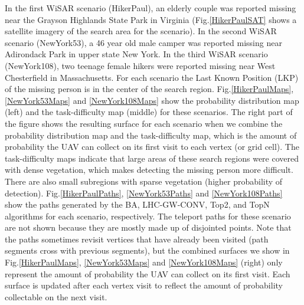 In the first WiSAR scenario (HikerPaul), an elderly couple was reported missing near the Grayson Highlands State Park in Virginia (Fig.\ref{HikerPaulSAT} shows a satellite imagery of the search area for the scenario). In the second WiSAR scenario (NewYork53), a 46 year old male camper was reported missing near Adirondack Park in upper state New York. In the third WiSAR scenario (NewYork108), two teenage female hikers were reported missing near West Chesterfield in Massachusetts. For each scenario the Last Known Position (LKP) of the missing person is in the center of the search region. Fig.\ref{HikerPaulMaps}, \ref{NewYork53Maps} and \ref{NewYork108Maps} show the probability distribution map (left) and the task-difficulty map (middle) for these scenarios. The right part of the figure shows the resulting surface for each scenario when we combine the probability distribution map and the task-difficulty map, which is the amount of probability the UAV can collect on its first visit to each vertex (or grid cell). The task-difficulty maps indicate that large areas of these search regions were covered with dense vegetation, which makes detecting the missing person more difficult. There are also small subregions with sparse vegetation (higher probability of detection). Fig.\ref{HikerPaulPaths}, \ref{NewYork53Paths} and \ref{NewYork108Paths} show the paths generated by the BA, LHC-GW-CONV, Top2, and TopN algorithms for each scenario, respectively. The teleport paths for these scenario are not shown because they are mostly made up of disjointed points. Note that the paths sometimes revisit vertices that have already been visited (path segments cross with previous segments), but the combined surfaces we show in Fig.\ref{HikerPaulMaps}, \ref{NewYork53Maps} and \ref{NewYork108Maps} (right) only represent the amount of probability the UAV can collect on its first visit. Each surface is updated after each vertex visit to reflect the amount of probability collectable on the next visit.


